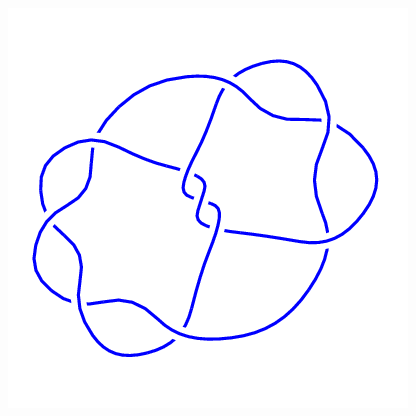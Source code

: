 \begin{figure}[H]
\begin{minipage}[b]{.18\linewidth}
	\end{minipage}
	\begin{minipage}[b]{.18\linewidth}
		\centering
		\includegraphics[width=\linewidth]{../data/10_61.png}
	\end{minipage}
\end{figure}
